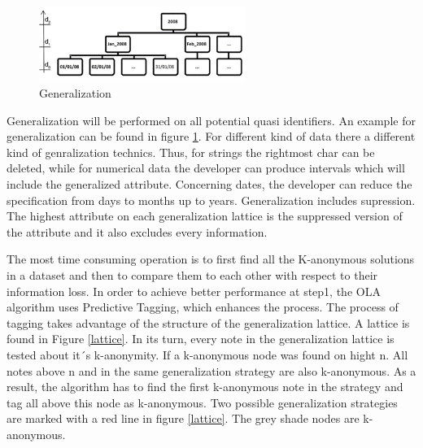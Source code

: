 \documentclass{llncs}
\begin{document}
\begin{figure}
	\centering
	\includegraphics[width=0.6\textwidth]{general1.png}
	\caption{Generalization\cite{el2009globally}}%
	\label{Generalization}
\end{figure}



Generalization will be performed on all potential quasi identifiers. An example for generalization can be found in figure \ref{Generalization}. For different kind of data there a different kind of genralization technics. Thus, for strings the rightmost char can be deleted, while for numerical data the developer can produce intervals which will include the generalized attribute. Concerning dates, the developer can reduce the specification from days to months up to years. Generalization includes supression. The highest attribute on each generalization lattice is the suppressed version of the attribute and it also excludes every information\cite{el2009globally}. 

The most time consuming operation is to first find all the K-anonymous solutions in a dataset and then to compare them to each other with respect to their information loss. In order to achieve better performance at step1, the OLA algorithm uses Predictive Tagging, which enhances the process. The process of tagging takes advantage of the structure of the generalization lattice. A lattice is found in Figure \ref{lattice}. In its turn, every note in the generalization lattice is tested about it´s k-anonymity. If a k-anonymous node was found on hight n. All notes above n and in the same generalization strategy are also k-anonymous. As a result, the algorithm has to find the first k-anonymous note in the strategy and tag all above this node as k-anonymous. Two possible generalization strategies are marked with a red line in figure \ref{lattice}. The grey shade nodes are k-anonymous.
\end{document}
